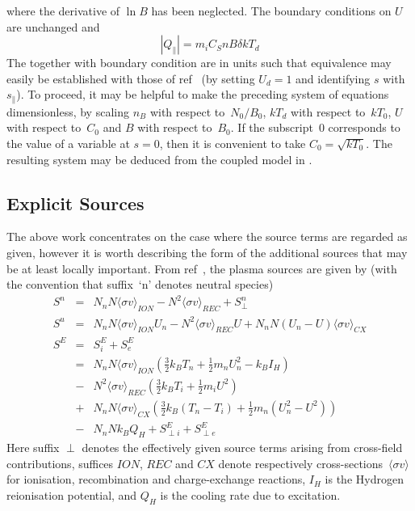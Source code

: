 where the derivative of $\ln B$ has been neglected. The boundary conditions on $U$ are
unchanged and
\begin{equation}\label{eq:Qpd}
|Q_{\parallel}|=
m_i C_S n B \delta kT_d
\end{equation}
The  together with boundary condition  are in units
such that equivalence may easily be established with those of ref~\cite{Ha13Benc} (by setting
$U_d=1$ and identifying $s$ with~$s_{\parallel}$).
To proceed, it may be helpful to make the preceding system of equations dimensionless,
by scaling $n_B$ with respect to~$N_0/B_0$, $kT_d$ with respect to~$kT_0$,
$U$ with respect to~$C_0$ and $B$ with respect to~$B_0$.
If the subscript~$0$ corresponds to the value of a variable at $s=0$, then
it is convenient to take $C_0=\sqrt{kT_0}$. The resulting system may be deduced
from the coupled model in .


\subsection{Explicit Sources}\label{sec:sources}
The above work concentrates on the case where the source terms are regarded
as given, however it is worth describing the form of the additional sources that
may be at least locally important.
From ref~\cite{Ha13Benc}, the plasma sources are given by (with the convention that suffix~`n'
denotes neutral species)
\begin{eqnarray}
\label{eq:Sn} S^n&=&N_n N \langle\sigma v\rangle_{ION} - N^2 \langle\sigma v\rangle_{REC} +S^n_{\perp} \\
\label{eq:Su} S^u&=&N_n N \langle\sigma v\rangle_{ION} U_n - N^2 \langle\sigma v\rangle_{REC} U + N_n N (U_n-U) \langle\sigma v\rangle_{CX} \\
\label{eq:SE} S^E&=&S^E_i+S^E_e \\
&=&N_n N \langle\sigma v\rangle_{ION} (\frac{3}{2} k_B T_n + \frac{1}{2} m_n U_n^2 -k_B I_H)\\
\nonumber &-& N^2 \langle\sigma v\rangle_{REC} (\frac{3}{2} k_B T_i + \frac{1}{2} m_i U^2 )\\
\nonumber &+&N_n N\langle\sigma v\rangle_{CX} \left(\frac{3}{2} k_B (T_n-T_i)  + \frac{1}{2} m_n (U_n^2-U^2)\right)\\
\nonumber &-&N_n N k_B Q_H +S^E_{\perp i} +S^E_{\perp e}
 \end{eqnarray}
Here suffix $\perp$ denotes the effectively given source terms arising from cross-field
contributions, suffices $ION$,
$REC$ and $CX$ denote respectively cross-sections~$\langle\sigma v\rangle$ for ionisation,
recombination and charge-exchange reactions, $I_H$ is the Hydrogen reionisation potential,
and $Q_H$ is the cooling rate due to excitation. 

